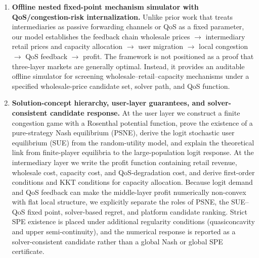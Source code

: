 \documentclass[11pt,a4paper]{article}
\begin{document}
\begin{enumerate}[leftmargin=2em]
\item \textbf{Offline nested fixed-point mechanism simulator with QoS/congestion-risk internalization.}
  Unlike prior work that treats intermediaries as passive forwarding channels or QoS as a fixed parameter, our model establishes the feedback chain wholesale prices $\to$ intermediary retail prices and capacity allocation $\to$ user migration $\to$ local congestion $\to$ QoS feedback $\to$ profit. The framework is not positioned as a proof that three-layer markets are generally optimal. Instead, it provides an auditable offline simulator for screening wholesale--retail--capacity mechanisms under a specified wholesale-price candidate set, solver path, and QoS function.

\item \textbf{Solution-concept hierarchy, user-layer guarantees, and solver-consistent candidate response.}
At the user layer we construct a finite congestion game with a Rosenthal potential function, prove the existence of a pure-strategy Nash equilibrium (PSNE), derive the logit stochastic user equilibrium (SUE) from the random-utility model, and explain the theoretical link from finite-player equilibria to the large-population logit response. At the intermediary layer we write the profit function containing retail revenue, wholesale cost, capacity cost, and QoS-degradation cost, and derive first-order conditions and KKT conditions for capacity allocation. Because logit demand and QoS feedback can make the middle-layer profit numerically non-convex with flat local structure, we explicitly separate the roles of PSNE, the SUE--QoS fixed point, solver-based regret, and platform candidate ranking. Strict SPE existence is placed under additional regularity conditions (quasiconcavity and upper semi-continuity), and the numerical response is reported as a solver-consistent candidate rather than a global Nash or global SPE certificate.


\end{enumerate}
\end{document}
